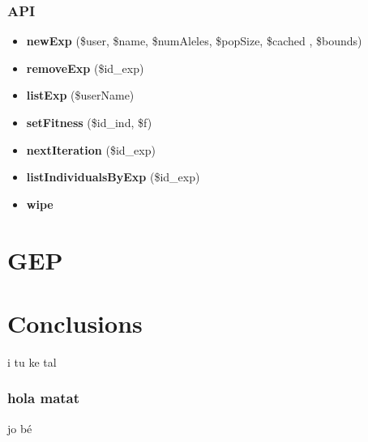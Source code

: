 \documentclass{beamer}
\begin{document}
\begin{frame}
\end{frame}
\begin{frame}
	\frametitle{API}
	\begin{itemize}
		\item \textbf{newExp} (\$user, \$name, \$numAleles, \$popSize, \$cached , \$bounds)
		\item \textbf{removeExp} (\$id\_exp)
		\item \textbf{listExp} (\$userName)
		\item \textbf{setFitness} (\$id\_ind, \$f)
		\item \textbf{nextIteration} (\$id\_exp)
		\item \textbf{listIndividualsByExp} (\$id\_exp)
		\item \textbf{wipe}
	\end{itemize}
\end{frame}


\section{GEP} %
\label{sec:GEP}

\section{Conclusions} %
\label{sec:Conclusions}
\begin{frame}
	i tu ke tal
\end{frame}

\subsubsection{hola matat} %
\label{ssub:hola matat}
\begin{frame}
	jo bé
\end{frame}




\end{document}
